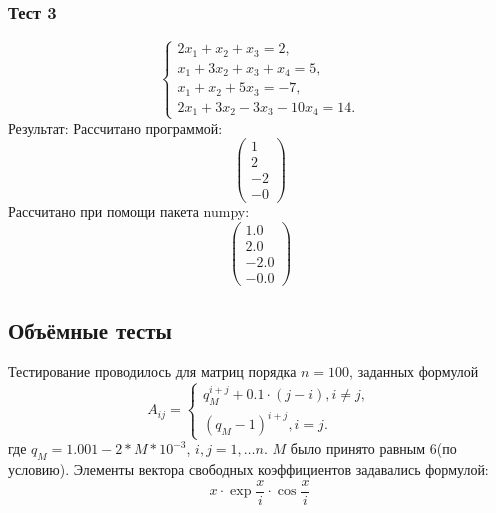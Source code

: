 \subsubsection{Тест 3}
\begin{equation*}
    \begin{cases}
    2x_1 + x_2 + x_3 = 2, \\
    x_1 + 3x_2 + x_3 + x_4 = 5, \\
    x_1 + x_2 + 5x_3 = -7, \\
    2x_1 + 3x_2 - 3x_3 - 10x_4 = 14.
    \end{cases}
\end{equation*}
Результат:
Рассчитано программой:
\begin{equation*}
    \begin{pmatrix}
        1 \\
        2 \\
        -2 \\
        -0
    \end{pmatrix}
\end{equation*}
Рассчитано при помощи пакета numpy:
\begin{equation*}
    \begin{pmatrix}
        1.0 \\
        2.0 \\
        -2.0 \\
        -0.0
    \end{pmatrix}
\end{equation*}
\newpage
\subsection{Объёмные тесты}

Тестирование проводилось для матриц порядка $n = 100$, заданных формулой
\begin{equation*}
A_{ij} = 
    \begin{cases}
        q_M^{i + j} + 0.1 \cdot (j - i), i \ne j, \\
        \left(q_M - 1\right)^{i + j}, i = j.
    \end{cases}
\end{equation*}
где $q_M = 1.001 - 2 * M * 10^{-3}$, $ i, j = 1, \ldots n$.
$M$ было принято равным 6(по условию).
Элементы вектора свободных коэффициентов задавались формулой:
$$
    x \cdot \exp{\frac{x}{i}} \cdot \cos{\frac{x}{i}}
$$

